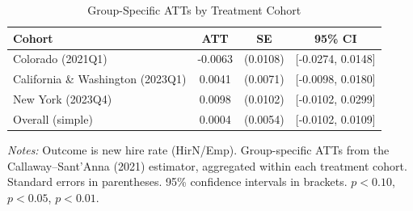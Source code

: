 \begin{table}[H]
\centering
\caption{Group-Specific ATTs by Treatment Cohort}
\label{tab:group_att}
\begin{threeparttable}
\begin{tabular}{lccc}
\toprule
Cohort & ATT & SE & 95\% CI \\
\midrule
Colorado (2021Q1) & -0.0063 & (0.0108) & [-0.0274, 0.0148] \\
California \& Washington (2023Q1) & 0.0041 & (0.0071) & [-0.0098, 0.0180] \\
New York (2023Q4) & 0.0098 & (0.0102) & [-0.0102, 0.0299] \\
\midrule
Overall (simple) & 0.0004 & (0.0054) & [-0.0102, 0.0109] \\
\bottomrule
\end{tabular}
\begin{tablenotes}[flushleft]
\small
\item \textit{Notes:} Outcome is new hire rate (HirN/Emp). Group-specific ATTs from the Callaway--Sant'Anna (2021) estimator, aggregated within each treatment cohort. Standard errors in parentheses. 95\% confidence intervals in brackets. \sym{*} \(p<0.10\), \sym{**} \(p<0.05\), \sym{***} \(p<0.01\).
\end{tablenotes}
\end{threeparttable}
\end{table}
